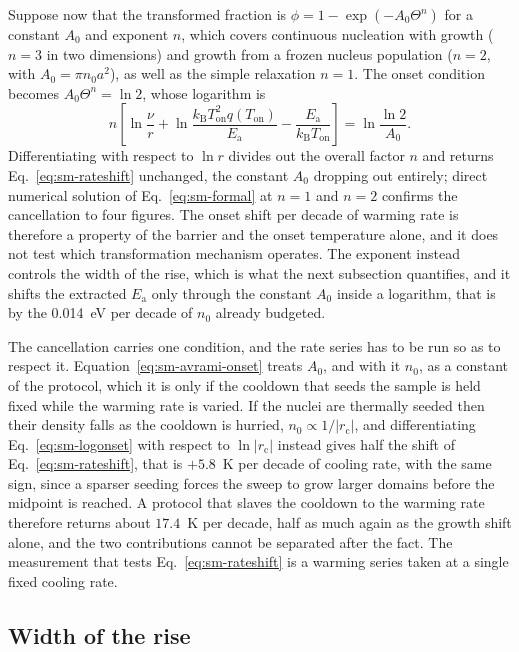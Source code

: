 \documentclass[reprint,twocolumn,prb,amsmath,amssymb,superscriptaddress,floatfix]{revtex4-2}
\newcommand{\kB}{k_{\mathrm{B}}}
\newcommand{\Ea}{E_{\mathrm{a}}}
\newcommand{\Ton}{T_{\mathrm{on}}}
\begin{document}
Suppose now that the transformed fraction is $\phi=1-\exp(-A_{0}\Theta^{n})$ for a constant
$A_{0}$ and exponent $n$, which covers continuous nucleation with growth ($n=3$ in two
dimensions) and growth from a frozen nucleus population ($n=2$, with $A_{0}=\pi n_{0}a^{2}$),
as well as the simple relaxation $n=1$. The onset condition becomes $A_{0}\Theta^{n}=\ln2$,
whose logarithm is
\begin{equation}
  n\left[\ln\frac{\nu}{r}+\ln\frac{\kB\Ton^{2}q(\Ton)}{\Ea}-\frac{\Ea}{\kB\Ton}\right]
  = \ln\frac{\ln2}{A_{0}}.
  \label{eq:sm-avrami-onset}
\end{equation}
Differentiating with respect to $\ln r$ divides out the overall factor $n$ and returns
Eq.~\eqref{eq:sm-rateshift} unchanged, the constant $A_{0}$ dropping out entirely; direct
numerical solution of Eq.~\eqref{eq:sm-formal} at $n=1$ and $n=2$ confirms the cancellation to
four figures. The onset shift per decade of warming rate is therefore a property of the barrier
and the onset temperature alone, and it does not test which transformation mechanism operates.
The exponent instead controls the width of the rise, which is what the next subsection
quantifies, and it shifts the extracted $\Ea$ only through the constant $A_{0}$ inside a
logarithm, that is by the 0.014~eV per decade of $n_{0}$ already budgeted.

The cancellation carries one condition, and the rate series has to be run so as to respect it.
Equation~\eqref{eq:sm-avrami-onset} treats $A_{0}$, and with it $n_{0}$, as a constant of the
protocol, which it is only if the cooldown that seeds the sample is held fixed while the
warming rate is varied. If the nuclei are thermally seeded then their density falls as the
cooldown is hurried, $n_{0}\propto1/|r_{\mathrm{c}}|$, and differentiating
Eq.~\eqref{eq:sm-logonset} with respect to $\ln|r_{\mathrm{c}}|$ instead gives half the shift
of Eq.~\eqref{eq:sm-rateshift}, that is $+5.8$~K per decade of cooling rate, with the same sign,
since a sparser seeding forces the sweep to grow larger domains before the midpoint is reached.
A protocol that slaves the cooldown to the warming rate therefore returns about $17.4$~K per
decade, half as much again as the growth shift alone, and the two contributions cannot be
separated after the fact. The measurement that tests Eq.~\eqref{eq:sm-rateshift} is a warming
series taken at a single fixed cooling rate.

\subsection{Width of the rise}
\end{document}
